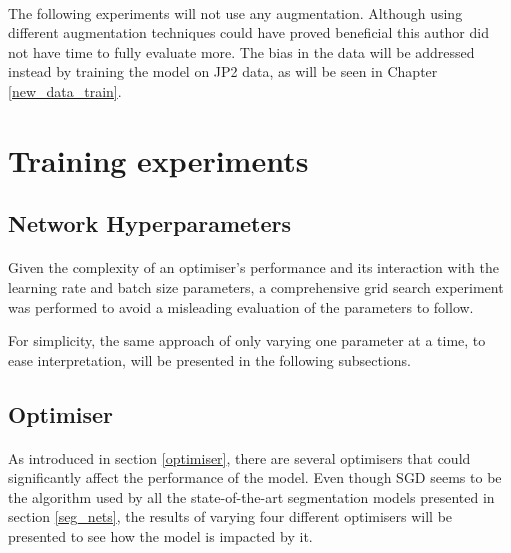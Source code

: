 \paragraph{}
 The following experiments will not use any augmentation. Although using different augmentation techniques could have proved beneficial this author did not have time to fully evaluate more. The bias in the data will be addressed instead by training the model on \gls{JP2} data, as will be seen in Chapter \ref{new_data_train}.

\section{Training experiments}
\subsection{Network Hyperparameters}
\paragraph{}
Given the complexity of an optimiser's performance and its interaction with the learning rate and batch size parameters, a comprehensive grid search experiment was performed to avoid a misleading evaluation of the parameters to follow.

For simplicity, the same approach of only varying one parameter at a time, to ease interpretation, will be presented in the following subsections.

\subsection{Optimiser}
\paragraph{}
As introduced  in section \ref{optimiser}, there are several optimisers that could significantly affect the performance of the model. Even though \gls{SGD} seems to be the algorithm used by all the state-of-the-art segmentation models presented in section \ref{seg_nets}, the results of varying four different optimisers will be presented to see how the model is impacted by it.

